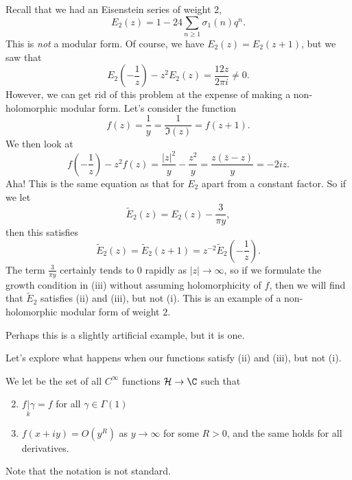 \documentclass[a4paper]{article}
\renewcommand{\H}{\mathcal{H}}
\begin{document}
\begin{eg}
  Recall that we had an Eisenstein series of weight $2$,
  \[
    E_2 (z) = 1 - 24 \sum_{n \geq 1} \sigma_1(n) q^n.
  \]
  This is \emph{not} a modular form. Of course, we have $E_2(z) = E_2(z + 1)$, but we saw that
  \[
    E_2 \left(-\frac{1}{z}\right) - z^2 E_2 (z) = \frac{12 z}{2\pi i} \not= 0.
  \]
  However, we can get rid of this problem at the expense of making a non-holomorphic modular form. Let's consider the function
  \[
    f(z) = \frac{1}{y} = \frac{1}{\Im (z)} = f(z + 1).
  \]
  We then look at
  \[
    f\left(-\frac{1}{z}\right) - z^2 f(z) = \frac{|z|^2}{y} - \frac{z^2}{y} = \frac{z(\bar{z} - z)}{y} = -2iz.
  \]
  Aha! This is the same equation as that for $E_2$ apart from a constant factor. So if we let
  \[
    \tilde{E}_2(z) = E_2(z) - \frac{3}{\pi y},
  \]
  then this satisfies
  \[
    \tilde{E}_2(z) = \tilde{E}_2(z + 1) = z^{-2}\tilde{E}_2\left(-\frac{1}{z}\right).
  \]
  The term $\frac{3}{\pi y}$ certainly tends to $0$ rapidly as $|z| \to \infty$, so if we formulate the growth condition in (iii) without assuming holomorphicity of $f$, then we will find that $\tilde{E}_2$ satisfies (ii) and (iii), but not (i). This is an example of a non-holomorphic modular form of weight $2$.
\end{eg}
Perhaps this is a slightly artificial example, but it is one.

Let's explore what happens when our functions satisfy (ii) and (iii), but not (i).
\begin{defi}
  We let  be the set of all $C^\infty$ functions $\H \to \C$ such that
  \begin{enumerate}\setcounter{enumi}{1}
    \item $f\underset{k}{|}\gamma = f$ for all $\gamma \in \Gamma(1)$
    \item $f(x + iy) = O(y^R)$ as $y \to \infty$ for some $R > 0$, and the same holds for all derivatives.
  \end{enumerate}
\end{defi}
Note that the notation is not standard.
\end{document}
